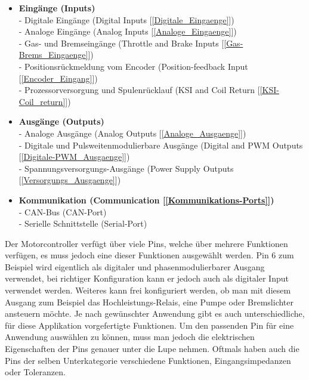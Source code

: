 \vspace{3mm}

\begin{itemize}
	\item \textbf{Eingänge (Inputs)} \medskip
	\\ - Digitale Eingänge (Digital Inputs [\ref{Digitale_Eingaenge}])
	\\ - Analoge Eingänge (Analog Inputs [\ref{Analoge_Eingaenge}])
	\\ - Gas- und Bremseingänge (Throttle and Brake Inputs [\ref{Gas-Brems_Eingaenge}])
	\\ - Positionsrückmeldung vom Encoder (Position-feedback Input [\ref{Encoder_Eingang}])
	\\ - Prozessorversorgung und Spulenrücklauf (KSI and Coil Return [\ref{KSI-Coil_return}]) \medskip
	\item \textbf{Ausgänge (Outputs)} \medskip
	\\ - Analoge Ausgänge (Analog Outputs [\ref{Analoge_Ausgaenge}])
	\\ - Digitale und Pulsweitenmodulierbare Ausgänge (Digital and PWM Outputs [\ref{Digitale-PWM_Ausgaenge}])
	\\ - Spannungsversorgungs-Ausgänge (Power Supply Outputs [\ref{Versorgungs_Ausgaenge}]) \medskip
	\item \textbf{Kommunikation (Communication [\ref{Kommunikations-Ports}])} \medskip
	\\ -  CAN-Bus (CAN-Port)
	\\ -  Serielle Schnittstelle (Serial-Port)
\end{itemize}

\vspace{5mm}

Der Motorcontroller verfügt über viele Pins, welche über mehrere Funktionen verfügen, es muss jedoch eine dieser Funktionen ausgewählt werden. Pin 6 zum Beispiel wird eigentlich als digitaler und phasenmodulierbarer Ausgang verwendet, bei richtiger Konfiguration kann er jedoch auch als digitaler Input verwendet werden. Weiteres kann frei konfiguriert werden, ob man mit diesem Ausgang zum Beispiel das Hochleistungs-Relais, eine Pumpe oder Bremslichter ansteuern möchte. Je nach gewünschter Anwendung gibt es auch unterschiedliche, für diese Applikation vorgefertigte Funktionen. Um den passenden Pin für eine Anwendung auswählen zu können, muss man jedoch die elektrischen Eigenschaften der Pins genauer unter die Lupe nehmen. Oftmals haben auch die Pins der selben Unterkategorie verschiedene Funktionen, Eingangsimpedanzen oder Toleranzen. 


